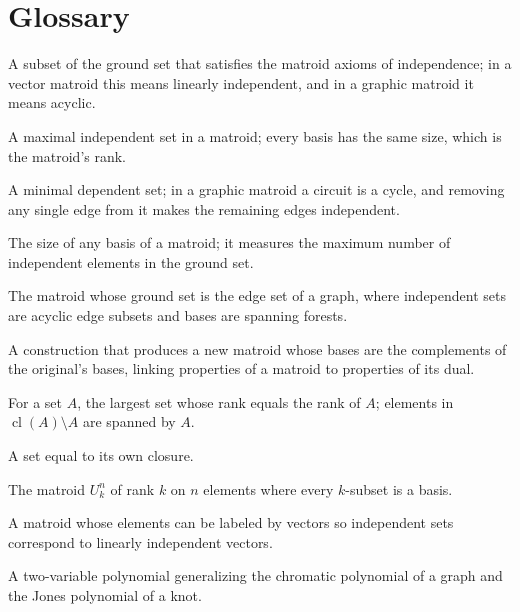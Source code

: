 \section*{Glossary}
\begin{description}[leftmargin=*,style=nextline,itemsep=0.3em]
\item[\textbf{Independent set.}] A subset of the ground set that satisfies the matroid axioms of independence; in a vector matroid this means linearly independent, and in a graphic matroid it means acyclic.
\item[\textbf{Basis.}] A maximal independent set in a matroid; every basis has the same size, which is the matroid's rank.
\item[\textbf{Circuit.}] A minimal dependent set; in a graphic matroid a circuit is a cycle, and removing any single edge from it makes the remaining edges independent.
\item[\textbf{Rank.}] The size of any basis of a matroid; it measures the maximum number of independent elements in the ground set.
\item[\textbf{Graphic matroid.}] The matroid whose ground set is the edge set of a graph, where independent sets are acyclic edge subsets and bases are spanning forests.
\item[\textbf{Matroid duality.}] A construction that produces a new matroid whose bases are the complements of the original's bases, linking properties of a matroid to properties of its dual.
\item[\textbf{Closure.}] For a set $A$, the largest set whose rank equals the rank of $A$; elements in $\operatorname{cl}(A)\setminus A$ are spanned by $A$.
\item[\textbf{Flat.}] A set equal to its own closure.
\item[\textbf{Uniform matroid.}] The matroid $U_k^n$ of rank $k$ on $n$ elements where every $k$-subset is a basis.
\item[\textbf{Representable matroid.}] A matroid whose elements can be labeled by vectors so independent sets correspond to linearly independent vectors.
\item[\textbf{Tutte polynomial.}] A two-variable polynomial generalizing the chromatic polynomial of a graph and the Jones polynomial of a knot.
\end{description}

